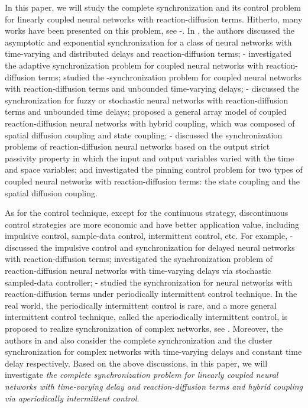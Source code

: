 \documentclass[review]{elsarticle}
\begin{document}
In this paper, we will study the complete synchronization and its control problem for linearly coupled neural networks with reaction-diffusion terms. Hitherto, many works have been presented on this problem, see \cite{WC2007}-\cite{WWHR2016}. In \cite{WC2007}, the authors discussed the asymptotic and exponential synchronization for a class of neural networks with time-varying and distributed delays and reaction-diffusion terms; \cite{SYL2009}-\cite{WWG2014} investigated the adaptive synchronization problem for coupled neural networks with reaction-diffusion terms; \cite{liu2010} studied the -synchronization problem for coupled neural networks with reaction-diffusion terms and unbounded time-varying delays; \cite{YJ2011}-\cite{SM2012} discussed the synchronization for fuzzy or stochastic neural networks with reaction-diffusion terms and unbounded time delays; \cite{WW2014} proposed a general array model of coupled reaction-diffusion neural networks with hybrid coupling, which was composed of spatial diffusion coupling and state coupling; \cite{WWG2011}-\cite{WWH2015} discussed the synchronization problems of reaction-diffusion neural networks based on the output strict passivity property in which the input and output variables varied with the time and space variables; and \cite{WWHR2016} investigated the pinning control problem for two types of coupled neural networks with reaction-diffusion terms: the state coupling and the spatial diffusion coupling.

As for the control technique, except for the continuous strategy, discontinuous control strategies are more economic and have better application value, including impulsive control, sample-data control, intermittent control, etc. For example, \cite{HJT2010}-\cite{YCY2013} discussed the impulsive control and synchronization for delayed neural networks with reaction-diffusion terms; \cite{RDZ2015} investigated the synchronization problem of reaction-diffusion neural networks with time-varying delays via stochastic sampled-data controller; \cite{HYJT2012}-\cite{MJWLXL2014} studied the synchronization for neural networks with reaction-diffusion terms under periodically intermittent control technique. In the real world, the periodically intermittent control \cite{LiuC11} is rare, and a more general intermittent control technique, called the aperiodically intermittent control, is proposed to realize synchronization of complex networks, see \cite{LC2015,esi2015}. Moreover, the authors in \cite{LC15} and \cite{LLC15} also consider the complete synchronization and the cluster synchronization for complex networks with time-varying delays and constant time delay respectively. Based on the above discussions, in this paper, we will investigate \emph{the complete synchronization problem for linearly coupled neural networks with time-varying delay and reaction-diffusion terms and hybrid coupling via aperiodically intermittent control}.
\end{document}
